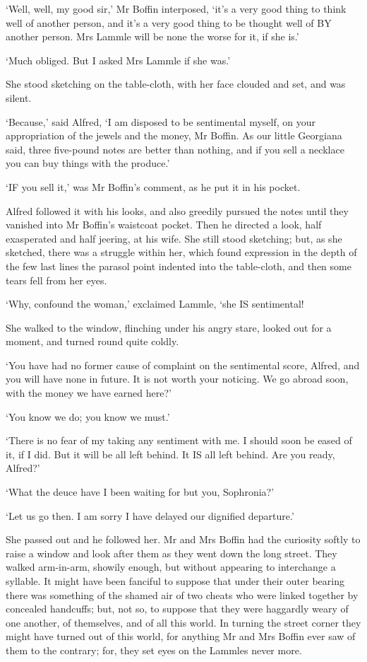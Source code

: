 ‘Well, well, my good sir,’ Mr Boffin interposed, ‘it’s a very good
thing to think well of another person, and it’s a very good thing to be
thought well of BY another person. Mrs Lammle will be none the worse for
it, if she is.’

‘Much obliged. But I asked Mrs Lammle if she was.’

She stood sketching on the table-cloth, with her face clouded and set,
and was silent.

‘Because,’ said Alfred, ‘I am disposed to be sentimental myself, on
your appropriation of the jewels and the money, Mr Boffin. As our little
Georgiana said, three five-pound notes are better than nothing, and if
you sell a necklace you can buy things with the produce.’

‘IF you sell it,’ was Mr Boffin’s comment, as he put it in his pocket.

Alfred followed it with his looks, and also greedily pursued the notes
until they vanished into Mr Boffin’s waistcoat pocket. Then he directed
a look, half exasperated and half jeering, at his wife. She still stood
sketching; but, as she sketched, there was a struggle within her, which
found expression in the depth of the few last lines the parasol point
indented into the table-cloth, and then some tears fell from her eyes.

‘Why, confound the woman,’ exclaimed Lammle, ‘she IS sentimental!

She walked to the window, flinching under his angry stare, looked out
for a moment, and turned round quite coldly.

‘You have had no former cause of complaint on the sentimental score,
Alfred, and you will have none in future. It is not worth your noticing.
We go abroad soon, with the money we have earned here?’

‘You know we do; you know we must.’

‘There is no fear of my taking any sentiment with me. I should soon be
eased of it, if I did. But it will be all left behind. It IS all left
behind. Are you ready, Alfred?’

‘What the deuce have I been waiting for but you, Sophronia?’

‘Let us go then. I am sorry I have delayed our dignified departure.’

She passed out and he followed her. Mr and Mrs Boffin had the curiosity
softly to raise a window and look after them as they went down the long
street. They walked arm-in-arm, showily enough, but without appearing
to interchange a syllable. It might have been fanciful to suppose that
under their outer bearing there was something of the shamed air of two
cheats who were linked together by concealed handcuffs; but, not so, to
suppose that they were haggardly weary of one another, of themselves,
and of all this world. In turning the street corner they might have
turned out of this world, for anything Mr and Mrs Boffin ever saw of
them to the contrary; for, they set eyes on the Lammles never more.




